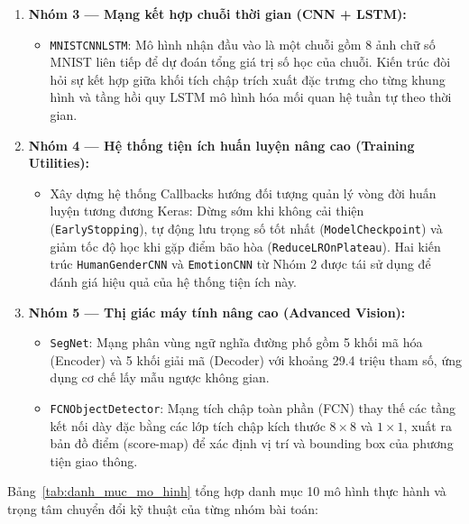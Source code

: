 \begin{enumerate}[label=\textbf{\arabic*.}]
\item \textbf{Nhóm 3 — Mạng kết hợp chuỗi thời gian (CNN + LSTM):}
\begin{itemize}
\item \texttt{MNISTCNNLSTM}: Mô hình nhận đầu vào là một chuỗi gồm 8 ảnh chữ số MNIST liên tiếp để dự đoán tổng giá trị số học của chuỗi. Kiến trúc đòi hỏi sự kết hợp giữa khối tích chập trích xuất đặc trưng cho từng khung hình và tầng hồi quy LSTM mô hình hóa mối quan hệ tuần tự theo thời gian.
\end{itemize}

\item \textbf{Nhóm 4 — Hệ thống tiện ích huấn luyện nâng cao (Training Utilities):}
\begin{itemize}
\item Xây dựng hệ thống Callbacks hướng đối tượng quản lý vòng đời huấn luyện tương đương Keras: Dừng sớm khi không cải thiện (\texttt{EarlyStopping}), tự động lưu trọng số tốt nhất (\texttt{ModelCheckpoint}) và giảm tốc độ học khi gặp điểm bão hòa (\texttt{ReduceLROnPlateau}). Hai kiến trúc \texttt{HumanGenderCNN} và \texttt{EmotionCNN} từ Nhóm 2 được tái sử dụng để đánh giá hiệu quả của hệ thống tiện ích này.
\end{itemize}

\item \textbf{Nhóm 5 — Thị giác máy tính nâng cao (Advanced Vision):}
\begin{itemize}
\item \texttt{SegNet}: Mạng phân vùng ngữ nghĩa đường phố gồm 5 khối mã hóa (Encoder) và 5 khối giải mã (Decoder) với khoảng 29.4 triệu tham số, ứng dụng cơ chế lấy mẫu ngược không gian.
\item \texttt{FCNObjectDetector}: Mạng tích chập toàn phần (FCN) thay thế các tầng kết nối dày đặc bằng các lớp tích chập kích thước $8\times 8$ và $1\times 1$, xuất ra bản đồ điểm (score-map) để xác định vị trí và bounding box của phương tiện giao thông.
\end{itemize}
\end{enumerate}

Bảng~\ref{tab:danh_muc_mo_hinh} tổng hợp danh mục 10 mô hình thực hành và trọng tâm chuyển đổi kỹ thuật của từng nhóm bài toán:

